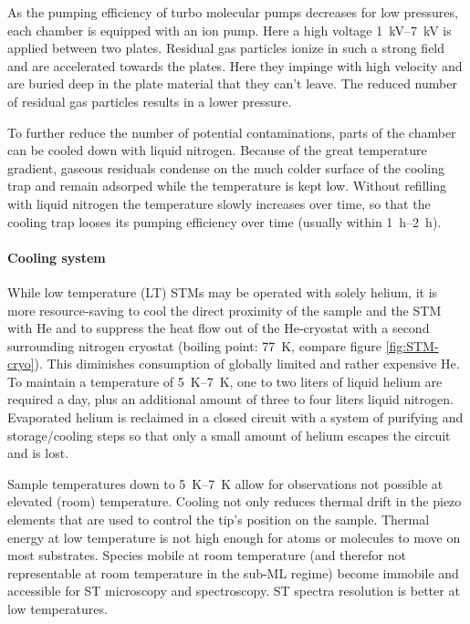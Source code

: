 As the pumping efficiency of turbo molecular pumps decreases for low pressures, each chamber is equipped with an ion pump. Here a high voltage \SIrange{1}{7}{\kilo \volt} is applied between two plates. Residual gas particles ionize in such a strong field and are accelerated towards the plates. Here they impinge with high velocity and are buried deep in the plate material that they can't leave. The reduced number of residual gas particles results in a lower pressure.

To further reduce the number of potential contaminations, parts of the chamber can be cooled down with liquid nitrogen. Because of the great temperature gradient, gaseous residuals condense on the much colder surface of the cooling trap and remain adsorped while the temperature is kept low. Without refilling with liquid nitrogen the temperature slowly increases over time, so that the cooling trap looses its pumping efficiency over time (usually within \SIrange{1}{2}{\hour}).

\paragraph{Cooling system} 
While low temperature (LT) STMs may be operated with solely helium, it is more resource-saving to cool the direct proximity of the sample and the STM with He and to suppress the heat flow out of the He-cryostat with a second surrounding nitrogen cryostat (boiling point: \SI{77}{\K}, compare figure \ref{fig:STM-cryo}). This diminishes consumption of globally limited and rather expensive He. To maintain a temperature of \SIrange{5}{7}{\K}, one to two liters of liquid helium are required a day, plus an additional amount of three to four liters liquid nitrogen. Evaporated helium is reclaimed in a closed circuit with a system of purifying and storage/cooling steps so that only a small amount of helium escapes the circuit and is lost.

Sample temperatures down to \SIrange{5}{7}{\K} allow for observations not possible at elevated (room) temperature. Cooling not only reduces thermal drift in the piezo elements that are used to control the tip's position on the sample. Thermal energy at low temperature is not high enough for atoms or molecules to move on most substrates. Species mobile at room temperature (and therefor not representable at room temperature in the sub-ML regime) become immobile and accessible for ST microscopy and spectroscopy. ST spectra resolution is better at low temperatures.

